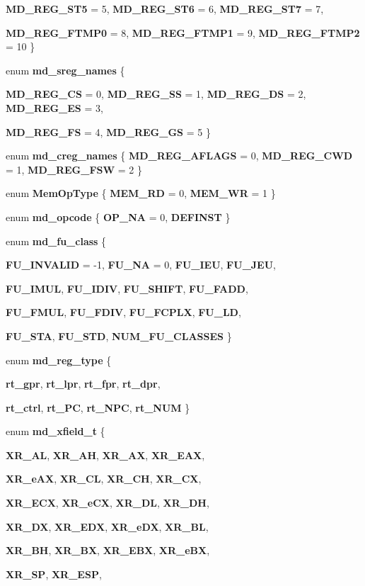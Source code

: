 \begin{CompactItemize}
{\bf MD\_\-REG\_\-ST5} =  5, 
{\bf MD\_\-REG\_\-ST6} =  6, 
{\bf MD\_\-REG\_\-ST7} =  7, 
\par
{\bf MD\_\-REG\_\-FTMP0} =  8, 
{\bf MD\_\-REG\_\-FTMP1} =  9, 
{\bf MD\_\-REG\_\-FTMP2} =  10
 \}
\item 
enum {\bf md\_\-sreg\_\-names} \{ \par
{\bf MD\_\-REG\_\-CS} =  0, 
{\bf MD\_\-REG\_\-SS} =  1, 
{\bf MD\_\-REG\_\-DS} =  2, 
{\bf MD\_\-REG\_\-ES} =  3, 
\par
{\bf MD\_\-REG\_\-FS} =  4, 
{\bf MD\_\-REG\_\-GS} =  5
 \}
\item 
enum {\bf md\_\-creg\_\-names} \{ {\bf MD\_\-REG\_\-AFLAGS} =  0, 
{\bf MD\_\-REG\_\-CWD} =  1, 
{\bf MD\_\-REG\_\-FSW} =  2
 \}
\item 
enum {\bf MemOpType} \{ {\bf MEM\_\-RD} =  0, 
{\bf MEM\_\-WR} = 1
 \}
\item 
enum {\bf md\_\-opcode} \{ {\bf OP\_\-NA} =  0, 
{\bf DEFINST}
 \}
\item 
enum {\bf md\_\-fu\_\-class} \{ \par
{\bf FU\_\-INVALID} =  -1, 
{\bf FU\_\-NA} =  0, 
{\bf FU\_\-IEU}, 
{\bf FU\_\-JEU}, 
\par
{\bf FU\_\-IMUL}, 
{\bf FU\_\-IDIV}, 
{\bf FU\_\-SHIFT}, 
{\bf FU\_\-FADD}, 
\par
{\bf FU\_\-FMUL}, 
{\bf FU\_\-FDIV}, 
{\bf FU\_\-FCPLX}, 
{\bf FU\_\-LD}, 
\par
{\bf FU\_\-STA}, 
{\bf FU\_\-STD}, 
{\bf NUM\_\-FU\_\-CLASSES}
 \}
\item 
enum {\bf md\_\-reg\_\-type} \{ \par
{\bf rt\_\-gpr}, 
{\bf rt\_\-lpr}, 
{\bf rt\_\-fpr}, 
{\bf rt\_\-dpr}, 
\par
{\bf rt\_\-ctrl}, 
{\bf rt\_\-PC}, 
{\bf rt\_\-NPC}, 
{\bf rt\_\-NUM}
 \}
\item 
enum {\bf md\_\-xfield\_\-t} \{ \par
{\bf XR\_\-AL}, 
{\bf XR\_\-AH}, 
{\bf XR\_\-AX}, 
{\bf XR\_\-EAX}, 
\par
{\bf XR\_\-eAX}, 
{\bf XR\_\-CL}, 
{\bf XR\_\-CH}, 
{\bf XR\_\-CX}, 
\par
{\bf XR\_\-ECX}, 
{\bf XR\_\-eCX}, 
{\bf XR\_\-DL}, 
{\bf XR\_\-DH}, 
\par
{\bf XR\_\-DX}, 
{\bf XR\_\-EDX}, 
{\bf XR\_\-eDX}, 
{\bf XR\_\-BL}, 
\par
{\bf XR\_\-BH}, 
{\bf XR\_\-BX}, 
{\bf XR\_\-EBX}, 
{\bf XR\_\-eBX}, 
\par
{\bf XR\_\-SP}, 
{\bf XR\_\-ESP}, 

\end{CompactItemize}
